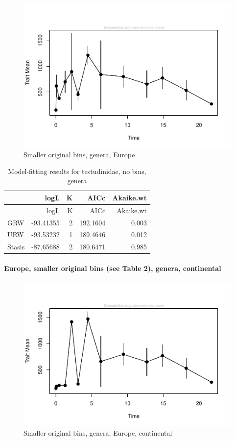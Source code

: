 \documentclass[]{article}
\let\oldparagraph\paragraph
\renewcommand{\paragraph}[1]{\oldparagraph{#1}\mbox{}}
\begin{document}
\begin{figure}[htbp]
\centering
\includegraphics{MA_JJ_files/figure-latex/paleoTS with different time bins, no bins, genera, Europe-1.pdf}
\caption{Smaller original bins, genera, Europe}
\end{figure}

\begin{longtable}[]{@{}lrrrr@{}}
\caption{Model-fitting results for testudinidae, no bins,
genera}\tabularnewline
\toprule
& logL & K & AICc & Akaike.wt\tabularnewline
\midrule
\endfirsthead
\toprule
& logL & K & AICc & Akaike.wt\tabularnewline
\midrule
\endhead
GRW & -93.41355 & 2 & 192.1604 & 0.003\tabularnewline
URW & -93.53232 & 1 & 189.4646 & 0.012\tabularnewline
Stasis & -87.65688 & 2 & 180.6471 & 0.985\tabularnewline
\bottomrule
\end{longtable}

\newpage

\paragraph{Europe, smaller original bins (see Table 2), genera,
continental}\label{europe-smaller-original-bins-see-table-2-genera-continental}

\begin{figure}[htbp]
\centering
\includegraphics{MA_JJ_files/figure-latex/paleoTS with different time bins, no bins, genera, Europe, continental-1.pdf}
\caption{Smaller original bins, genera, Europe, continental}
\end{figure}
\end{document}
